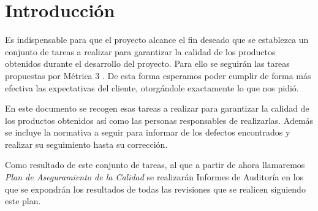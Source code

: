\section{Introducción}
\par Es indispensable para que el proyecto alcance el fin deseado que se establezca
un conjunto de tareas a realizar para garantizar la calidad de los productos
obtenidos durante el desarrollo del proyecto. Para ello se seguirán las tareas
propuestas por Métrica 3 \cite{WEB:Metrica3}. De esta forma esperamos
poder cumplir de forma más efectiva las expectativas del cliente, otorgándole exactamente
lo que nos pidió.



\par En este documento se recogen esas tareas a realizar para garantizar la calidad de los
productos obtenidos así como las personas responsables de realizarlas. Además se incluye la
normativa a seguir para informar de los defectos encontrados y realizar su seguimiento hasta
su corrección.



\par Como resultado de este conjunto de tareas, al que a partir de ahora llamaremos \textit{Plan de
Aseguramiento de la Calidad} se realizarán Informes de Auditoría en los que se expondrán los
resultados de todas las revisiones que se realicen siguiendo este plan.

